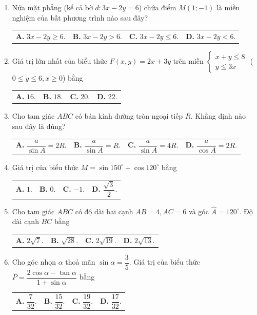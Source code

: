 \documentclass[12pt,a4paper]{article}
\makeatletter
\newcommand{\four}[4]{\par\noindent\begin{tabularx}{\linewidth}{@{}*{4}{>{\raggedright\arraybackslash}X}@{}}\textbf{A.} #1&\textbf{B.} #2&\textbf{C.} #3&\textbf{D.} #4\end{tabularx}}
\makeatother
\begin{document}
\begin{enumerate}
\item Nửa mặt phẳng (kể cả bờ $d: 3x - 2y = 6$) chứa điểm $M(1; -1)$ là miền nghiệm của bất phương trình nào sau đây?
\four{$3x - 2y \ge 6$.}{$3x - 2y > 6$.}{$3x - 2y \le 6$.}{$3x - 2y < 6$.}

\item Giá trị lớn nhất của biểu thức $F(x, y) = 2x + 3y$ trên miền $\begin{cases} x + y \le 8 \\ y \le 3x \end{cases}$ ($0 \le y \le 6, x \ge 0$) bằng
\four{$16$.}{$18$.}{$20$.}{$22$.}

\item Cho tam giác $ABC$ có bán kính đường tròn ngoại tiếp $R$. Khẳng định nào sau đây là đúng?
\four{$\dfrac{a}{\sin A} = 2R$.}{$\dfrac{a}{\sin A} = R$.}{$\dfrac{a}{\sin A} = 4R$.}{$\dfrac{a}{\cos A} = 2R$.}

\item Giá trị của biểu thức $M = \sin 150^\circ + \cos 120^\circ$ bằng
\four{$1$.}{$0$.}{$-1$.}{$\dfrac{\sqrt{3}}{2}$.}

\item Cho tam giác $ABC$ có độ dài hai cạnh $AB = 4, AC = 6$ và góc $\widehat{A} = 120^\circ$. Độ dài cạnh $BC$ bằng
\four{$2\sqrt{7}$.}{$\sqrt{28}$.}{$2\sqrt{19}$.}{$2\sqrt{13}$.}

\item Cho góc nhọn $\alpha$ thoả mãn $\sin \alpha = \dfrac{3}{5}$. Giá trị của biểu thức $P = \dfrac{2\cos \alpha - \tan \alpha}{1 + \sin \alpha}$ bằng
\four{$\dfrac{7}{32}$.}{$\dfrac{15}{32}$.}{$\dfrac{19}{32}$.}{$\dfrac{17}{32}$.}
\end{enumerate}
\newpage
\end{document}
